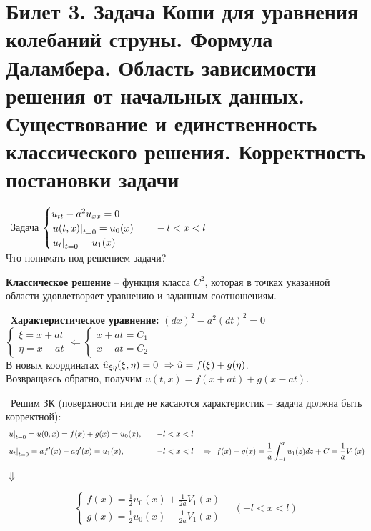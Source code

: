 \section{Билет 3. Задача Коши для уравнения колебаний струны. Формула Даламбера. Область зависимости решения от начальных данных. Существование и единственность классического решения. Корректность постановки задачи}
\textbullet\ Задача $\begin{cases} u_{tt}-a^2u_{xx} = 0\\ \left. u(t,x)\right|_{t=0} = u_0(x)\\ \left. u_t\right|_{t=0} = u_1(x)\end{cases}\quad -l<x<l$\\
Что понимать под решением задачи?\\
\begin{definition}
{\bf Классическое решение} -- функция класса $C^2$, которая в точках указанной области удовлетворяет уравнению и заданным соотношениям.\\
\end{definition}
\textbullet\ {\bf Характеристическое уравнение: } $(dx)^2 - a^2(dt)^2 = 0$\\
$\begin{cases} \xi = x+at \\ \eta = x-at \end{cases} \Leftarrow \begin{cases} x+at = C_1 \\ x-at = C_2 \end{cases}$\\
В новых координатах $\hat{u}_{\xi\eta}(\xi,\eta) = 0\ \Rightarrow \hat{u} = f(\xi) + g(\eta) $.\\
Возвращаясь обратно, получим $u(t,x) = f(x+at) + g(x-at)$.\par
\textbullet\ Решим ЗК (поверхности нигде не касаются характеристик -- задача должна быть корректной):
\begin{equation*}
\begin{aligned}
&\left. u\right|_{t=0} = u(0,x) = f(x) + g(x) = u_0(x), \quad &-l < x< l&\\
&\left. u_t\right|_{t=0} =  af'(x) - ag'(x) = u_1(x), \quad &-l < x< l& \quad \Rightarrow\ f(x) - g(x) = \frac1{a}\int _{-l}^xu_1(z)dz + C = \frac1{a}V_1(x)
\end{aligned}
\end{equation*}
\begin{center}
$\Downarrow$
\end{center}
\begin{equation}
\label{eq::3::dalam}
\tag{*}
\begin{cases} f(x) = \frac1{2}u_0(x) + \frac1{2a}V_1(x) \\ g(x) = \frac1{2}u_0(x) - \frac1{2a}V_1(x) \end{cases} \quad (-l < x< l)
\end{equation}
